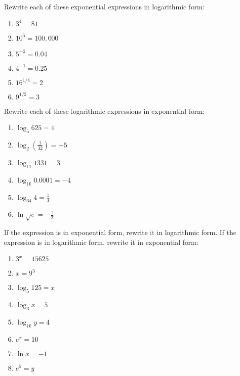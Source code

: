 \begin{puzzle}
    Rewrite each of these exponential expressions in logarithmic form:
    \begin{enumerate}
        \item \(3^4 = 81\)
        \item \(10^5 = 100,000\)
        \item \(5^{-2} = 0.04\)
        \item \(4^{-1} = 0.25\)
        \item \(16^{1/4} = 2\)
        \item \(9^{1/2} = 3\)
    \end{enumerate}
\end{puzzle}

\begin{puzzle}
    Rewrite each of these logarithmic expressions in exponential form:
    \begin{enumerate}
        \item \(\log_5 625 = 4\)
        \item \(\log_2 \left(\frac{1}{32}\right) = -5\)
        \item \(\log_{11} 1331 = 3\)
        \item \(\log_{10} 0.0001 = -4\)
        \item \(\log_{64} 4 = \frac{1}{3}\)
        \item \(\ln \sqrt{e} = -\frac{1}{2}\)
    \end{enumerate}
\end{puzzle}

\begin{puzzle}
    If the expression is in exponential form, rewrite it in logarithmic form. If the expression is in logarithmic form, rewrite it in exponential form:
    \begin{enumerate}
        \item \(3^x = 15625\)
        \item \(x = 9^3\)
        \item \(\log_5 125 = x\)
        \item \(\log_3 x = 5\)
        \item \(\log_{10} y = 4\)
        \item \(e^x = 10\)
        \item \(\ln x = -1\)
        \item \(e^5 = y\)
    \end{enumerate}
\end{puzzle}
